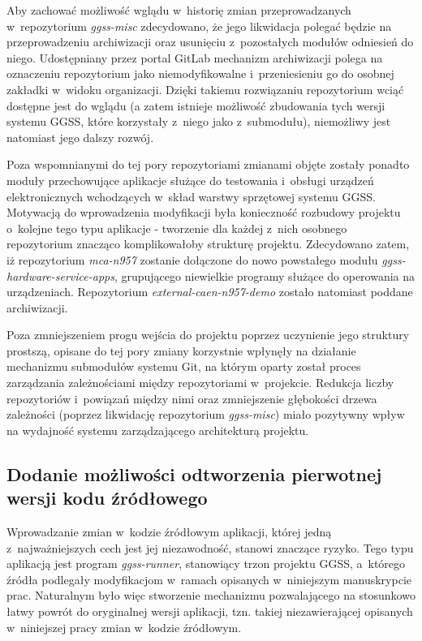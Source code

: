 Aby zachować możliwość wglądu w~historię zmian przeprowadzanych w~repozytorium \emph{ggss-misc} zdecydowano, że jego likwidacja polegać będzie na przeprowadzeniu archiwizacji oraz usunięciu z~pozostałych modułów odniesień do niego. Udostępniany przez portal GitLab mechanizm archiwizacji polega na oznaczeniu repozytorium jako niemodyfikowalne i~przeniesieniu go do osobnej zakładki w~widoku organizacji. Dzięki takiemu rozwiązaniu repozytorium wciąć dostępne jest do wglądu (a zatem istnieje możliwość zbudowania tych wersji systemu GGSS, które korzystały z~niego jako z~submodułu), niemożliwy jest natomiast jego dalszy rozwój.


Poza wspomnianymi do tej pory repozytoriami zmianami objęte zostały ponadto moduły przechowujące aplikacje służące do testowania i~obsługi urządzeń elektronicznych wchodzących w~skład warstwy sprzętowej systemu GGSS. Motywacją do wprowadzenia modyfikacji była konieczność rozbudowy projektu o~kolejne tego typu aplikacje - tworzenie dla każdej z~nich osobnego repozytorium znacząco komplikowałoby strukturę projektu. Zdecydowano zatem, iż repozytorium \emph{mca-n957} zostanie dołączone do nowo powstałego modułu \emph{ggss-hardware-service-apps}, grupującego niewielkie programy służące do operowania na urządzeniach. Repozytorium \emph{external-caen-n957-demo} zostało natomiast poddane archiwizacji.

Poza zmniejszeniem progu wejścia do projektu poprzez uczynienie jego struktury prostszą, opisane do tej pory zmiany korzystnie wpłynęły na działanie mechanizmu submodułów systemu Git, na którym oparty został proces zarządzania zależnościami między repozytoriami w~projekcie. Redukcja liczby repozytoriów i~powiązań między nimi oraz zmniejszenie głębokości drzewa zależności (poprzez likwidację repozytorium \emph{ggss-misc}) miało pozytywny wpływ na wydajność systemu zarządzającego architekturą projektu. 



\subsection{Dodanie możliwości odtworzenia pierwotnej wersji kodu źródłowego}
Wprowadzanie zmian w~kodzie źródłowym aplikacji, której jedną z~najważniejszych cech jest jej niezawodność, stanowi znaczące ryzyko. Tego typu aplikacją jest program \emph{ggss-runner}, stanowiący trzon projektu GGSS, a~którego źródła podlegały modyfikacjom w~ramach opisanych w~niniejszym manuskrypcie prac. Naturalnym było więc stworzenie mechanizmu pozwalającego na stosunkowo łatwy powrót do oryginalnej wersji aplikacji, tzn. takiej niezawierającej opisanych w~niniejszej pracy zmian w~kodzie źródłowym.

